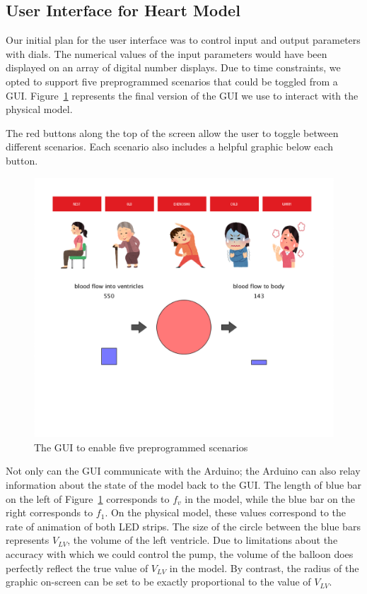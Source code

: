 \documentclass[a4paper, 10pt, american, titlepage]{article}
\begin{document}
\subsection{User Interface for Heart Model}
\label{sec:userInterfaceForHeartModel}

Our initial plan for the user interface was to control input and output
parameters with dials. The numerical values of the input parameters would have
been displayed on an array of digital number displays. Due to time constraints,
we opted to support five preprogrammed scenarios that could be toggled from a
GUI. Figure~\ref{fig:heartGui} represents the final version of the GUI we use to
interact with the physical model.

The red buttons along the top of the screen allow the user to toggle between
different scenarios. Each scenario also includes a helpful graphic below each
button.

\begin{figure}[h] \centering
    \includegraphics[width=\textwidth]{heart-gui.png}
    \caption{The GUI to enable five preprogrammed scenarios}
    \label{fig:heartGui}
\end{figure}

Not only can the GUI communicate with the Arduino; the Arduino can also relay
information about the state of the model back to the GUI. The length of blue bar
on the left of Figure~\ref{fig:heartGui} corresponds to $f_{v}$ in the model,
while the blue bar on the right corresponds to $f_{1}$. On the physical model,
these values correspond to the rate of animation of both LED strips. The size of
the circle between the blue bars represents $V_{LV}$, the volume of the left
ventricle. Due to limitations about the accuracy with which we could control the
pump, the volume of the balloon does perfectly reflect the true value of
$V_{LV}$ in the model. By contrast, the radius of the graphic on-screen can be
set to be exactly proportional to the value of $V_{LV}$.
\end{document}
